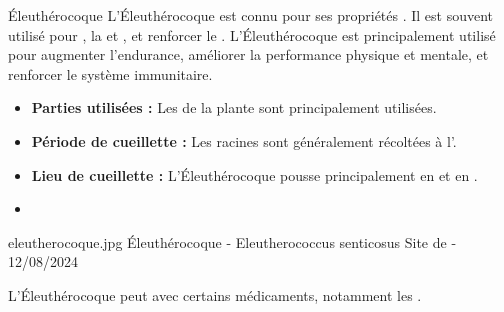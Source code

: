 \ficheidentiteplante
{Éleuthérocoque}
{%
  L'Éleuthérocoque est connu pour ses propriétés . Il est souvent utilisé pour ,  la  et , et renforcer le .
}
{%
   L'Éleuthérocoque est principalement utilisé pour augmenter l'endurance, améliorer la performance physique et mentale, et renforcer le système immunitaire.
}
{%
   \begin{itemize}[label = \bcplume]
        \item \textbf{Parties utilisées :} Les  de la plante sont principalement utilisées.
        \item \textbf{Période de cueillette :} Les racines sont généralement récoltées à l'.
        \item \textbf{Lieu de cueillette :} L'Éleuthérocoque pousse principalement en  et en .
    \end{itemize}
}
{%
    \begin{itemize}
        \item 
    \end{itemize}
}
{%
    \begin{multicols}{2}


        \columnbreak


    \end{multicols}
}
{%
    eleutherocoque.jpg
}
{%
    Éleuthérocoque - Eleutherococcus senticosus
}
{%
    Site de  - 12/08/2024 
}

\begin{Remarque}
    L'Éleuthérocoque peut  avec certains médicaments, notamment les . 

\end{Remarque}